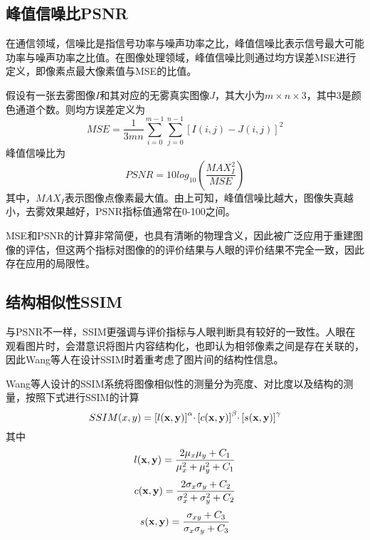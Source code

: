 \documentclass[a4paper, 12pt, oneside]{report}
\begin{document}
{\subsection{峰值信噪比PSNR\quad}

在通信领域，信噪比是指信号功率与噪声功率之比，峰值信噪比表示信号最大可能功率与噪声功率之比值。在图像处理领域，峰值信噪比则通过均方误差MSE进行定义，即像素点最大像素值与MSE的比值。

假设有一张去雾图像$I$和其对应的无雾真实图像$J$，其大小为$m \times n \times 3$，其中3是颜色通道个数。则均方误差定义为
\begin{equation}
MSE = \frac{1}{3mn}\sum_{i = 0}^{m - 1}\sum_{j = 0}^{n - 1}{[I(i, j) - J(i, j)] }^2
\end{equation}
峰值信噪比为
\begin{equation}
PSNR = 10 log_{10}(\frac{MAX_I^2}{MSE})
\end{equation}
其中，$MAX_I$表示图像点像素最大值。由上可知，峰值信噪比越大，图像失真越小，去雾效果越好，PSNR指标值通常在0-100之间。
	
MSE和PSNR的计算非常简便，也具有清晰的物理含义，因此被广泛应用于重建图像的评估，但这两个指标对图像的的评价结果与人眼的评价结果不完全一致，因此存在应用的局限性。

\subsection{结构相似性SSIM\quad}
与PSNR不一样，SSIM更强调与评价指标与人眼判断具有较好的一致性。人眼在观看图片时，会潜意识将图片内容结构化，也即认为相邻像素之间是存在关联的，因此Wang\cite{ref24}等人在设计SSIM时着重考虑了图片间的结构性信息。
	
Wang等人设计的SSIM系统将图像相似性的测量分为亮度、对比度以及结构的测量，按照下式进行SSIM的计算
\begin{equation}
SSIM(x, y) = {[l{\bf (x, y)}]}^{\alpha}\cdotp {[c{\bf (x, y)}]}^{\beta}\cdotp {[s{\bf (x, y)}]}^{\gamma} 
\end{equation}
其中
\begin{equation}
l{\bf (x, y)} = \frac{2\mu_x\mu_y + C_1}{\mu_x^2 + \mu_y^2 + C_1}
\end{equation}
\begin{equation}
c{\bf (x, y)} = \frac{2\sigma_x\sigma_y + C_2}{\sigma_x^2 + \sigma_y^2 + C_2}
\end{equation}
\begin{equation}
s{\bf (x, y)} = \frac{\sigma_{xy}+ C_3}{\sigma_x\sigma_y + C_3}
\end{equation}

}
\end{document}
